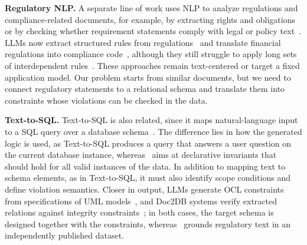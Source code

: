 \smallskip
\noindent\textbf{Regulatory NLP.}
A separate line of work uses NLP to analyze regulations and compliance-related documents, for example, by extracting rights and obligations or by checking whether requirement statements comply with legal or policy text~\cite{breaux2006regulatory,kiyavitskaya2008automating,amaral2023nlp,hassani2024rethinking,compliance2025ACMTSEM,masoudifard2024graphrag}. LLMs now extract structured rules from regulations~\cite{guliani2026dejure,hettiarachchi-etal-2025-code,kabzhan2025semantic} and translate financial regulations into compliance code~\cite{li2025compliance2code}, although they still struggle to apply long sets of interdependent rules~\cite{yu2026ruleworld,soni2026tam}. These approaches remain text-centered or target a fixed application model. Our problem starts from similar documents, but we need to connect regulatory statements to a relational schema and translate them into constraints whose violations can be checked in the data.

\smallskip
\noindent\textbf{Text-to-SQL.}
Text-to-SQL is also related, since it maps natural-language input to a SQL query over a database schema~\cite{yu2018spider,picard2021,resdsql2023,pourreza2023din,dail2025,llmTEXT2SQLSurvey2025,redsql2025,XiYanSQL,alrashed2026verification,rabonato2026portuguese}. The difference lies in how the generated logic is used, as Text-to-SQL produces a query that answers a user question on the current database instance, whereas \system\ aims at declarative invariants that should hold for all valid instances of the data. In addition to mapping text to schema elements, as in Text-to-SQL, it must also identify scope conditions and define violation semantics. Closer in output, LLMs generate OCL constraints from specifications of UML models~\cite{abukhalaf2023ocl,attarwala2026ocl}, and Doc2DB systems verify extracted relations against integrity constraints~\cite{zhang2026doc2db}; in both cases, the target schema is designed together with the constraints, whereas \system\ grounds regulatory text in an independently published dataset.
